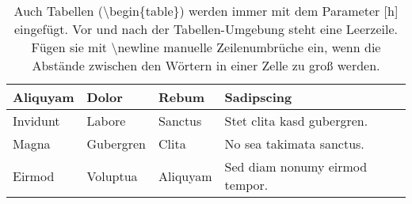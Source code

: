\begin{table}[h] %
	\caption[Od quo tecto offic torit eteum acerum fuga. Ideni omnihic idundero doluptus iminvel luptati busdaepta sequi dolorec tatessinum.]{Auch Tabellen (\glqq \textbackslash begin\{table\}\grqq{}) werden immer mit dem Parameter [h] eingefügt. Vor und nach der Tabellen-Umgebung steht eine Leerzeile. Fügen sie mit \glqq \textbackslash newline\grqq{} manuelle Zeilenumbrüche ein, wenn die Abstände zwischen den Wörtern in einer Zelle zu groß werden.}
	\centering
	\begin{tabular}{ | l | l | l | p{2.5cm} |}
			\hline
			Aliquyam & Dolor & Rebum & Sadipscing \\ \hline
			Invidunt & Labore & Sanctus & Stet clita kasd \newline gubergren. \\ \hline
			Magna & Gubergren & Clita & No sea takimata \newline sanctus. \\ \hline
			Eirmod & Voluptua & Aliquyam & Sed diam nonumy eirmod tempor. \\
			\hline%
	\end{tabular}%
	\label{tab:tab}%
\end{table}%

